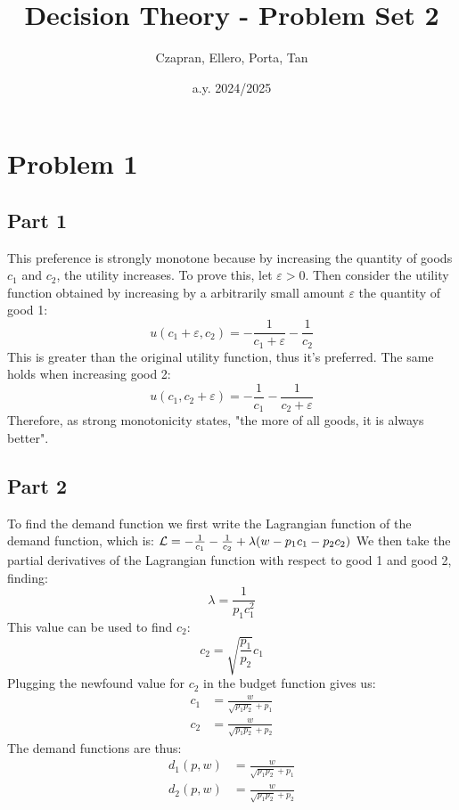 \documentclass[12pt]{extarticle}
\title{Decision Theory - Problem Set 2}
\author{Czapran, Ellero, Porta, Tan}
\date{a.y. 2024/2025}
\numberwithin{table}{section}
\numberwithin{figure}{section}
\numberwithin{equation}{section}
\begin{document}
\maketitle

\section*{Problem 1}

\subsection*{Part 1}
This preference is strongly monotone because by increasing the quantity of goods $c_1$ and $c_2$, the utility increases.
To prove this, let $\varepsilon>0$.
Then consider the utility function obtained by increasing
by a arbitrarily small amount $\varepsilon$ the quantity of good 1:
\begin{equation}
	u(c_1 + \varepsilon,c_2)=-\frac{1}{c_1+\varepsilon}-\frac{1}{c_2}
\end{equation}
This is greater than the original utility function, thus it's preferred. The same holds when increasing good 2:
\begin{equation}
	u(c_1,c_2 + \varepsilon)=-\frac{1}{c_1}-\frac{1}{c_2 + \varepsilon}
\end{equation}
Therefore, as strong monotonicity states, "the more of all goods, it is always better".

\subsection*{Part 2}
To find the demand function we first write the Lagrangian function of the demand function,
which is: ${\cal L}= -\frac{1}{c_1}-\frac{1}{c_2}+ \lambda(w-p_1c_1-p_2c_2)$
We then take the partial derivatives of the Lagrangian function with respect to good 1 and good 2, finding:
\begin{equation}
	\lambda= \frac{1}{p_1c_1^2}
\end{equation}
This value can be used to find $c_2$:
\begin{equation}
	c_2=\sqrt{\frac{p_1}{p_2}}c_1
\end{equation}
Plugging the newfound value for $c_2$ in the budget function gives us:
\begin{align}
	c_1 & = \frac{w}{\sqrt{p_1p_2}+p_1} \\
	c_2 & = \frac{w}{\sqrt{p_1p_2}+p_2}
\end{align}
The demand functions are thus:
\begin{align}
	d_1(p,w) & = \frac{w}{\sqrt{p_1p_2}+p_1} \\
	d_2(p,w) & = \frac{w}{\sqrt{p_1p_2}+p_2}
\end{align}
\end{document}
